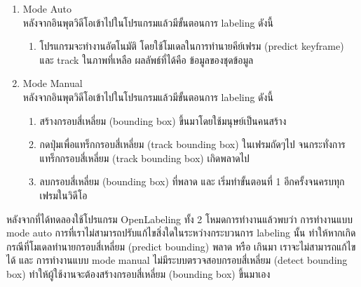\begin{enumerate}
	\setlength\itemsep{-0.25em}
	\item Mode Auto
	\\ หลังจากอินพุตวิดีโอเข้าไปในโปรแกรมแล้วมีขั้นตอนการ labeling ดังนี้ 
   	\begin{enumerate}
	\setlength\itemsep{-0.25em}
    		\item โปรแกรมจะทำงานอัตโนมัติ โดยใช้โมเดลในการทำนายคีย์เฟรม (predict keyframe)  และ track ในภาพที่เหลือ ผลลัพธ์ที่ได้คือ ข้อมูลของชุดข้อมูล
 	\end{enumerate}
	\item Mode Manual
	\\ หลังจากอินพุตวิดีโอเข้าไปในโปรแกรมแล้วมีขั้นตอนการ labeling ดังนี้ 
	\begin{enumerate}
	\setlength\itemsep{-0.25em}
    		\item สร้างกรอบสี่เหลี่ยม (bounding box) ขึ้นมาโดยใช้มนุษย์เป็นคนสร้าง
		\item กดปุ่มเพื่อแทร็กกรอบสี่เหลี่ยม (track bounding box) ในเฟรมถัดๆไป จนกระทั่งการแทร็กกรอบสี่เหลี่ยม (track bounding box) เกิดพลาดไป
		\item ลบกรอบสี่เหลี่ยม (bounding box) ที่พลาด และ เริ่มทำขั้นตอนที่ 1 อีกครั้งจนครบทุกเฟรมในวิดีโอ
 	\end{enumerate}
 \end{enumerate}
หลังจากที่ได้ทดลองใช้โปรแกรม OpenLabeling ทั้ง 2 โหมดการทำงานแล้วพบว่า การทำงานแบบ mode auto การที่เราไม่สามารถปรับแก้ไขสิ่งใดในระหว่างกระบวนการ labeling นั้น ทำให้หากเกิดกรณีที่โมเดลทำนายกรอบสี่เหลี่ยม (predict bounding) พลาด หรือ เกินมา เราจะไม่สามารถแก้ไขได้ และ การทำงานแบบ mode manual ไม่มีระบบตรวจสอบกรอบสี่เหลี่ยม (detect bounding box) ทำให้ผู้ใช้งานจะต้องสร้างกรอบสี่เหลี่ยม (bounding box) ขึ้นมาเอง


